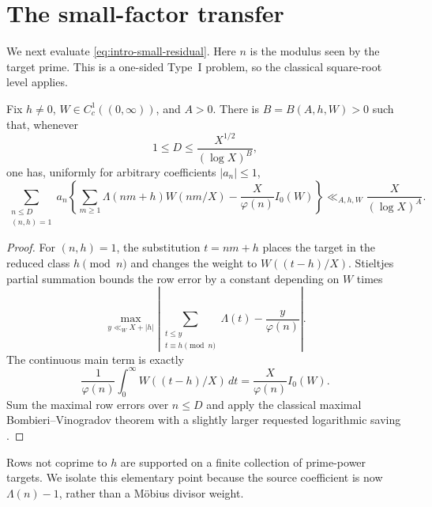 \section{The small-factor transfer}
\label{sec:small-factor-transfer}

We next evaluate \eqref{eq:intro-small-residual}.  Here $n$ is the modulus
seen by the target prime.  This is a one-sided Type~I problem, so the
classical square-root level applies.

\begin{theorem}
\label{thm:fixed-product-Type-I}
Fix $h\ne0$, $W\in C_c^1((0,\infty))$, and $A>0$.  There is
$B=B(A,h,W)>0$ such that, whenever
\begin{equation}\label{eq:fixed-product-BV-range}
 1\leq D\leq\frac{X^{1/2}}{(\log X)^B},
\end{equation}
one has, uniformly for arbitrary coefficients $|a_n|\leq1$,
\begin{equation}\label{eq:fixed-product-Type-I}
 \sum_{\substack{n\leq D\\(n,h)=1}}a_n
 \left\{
   \sum_{m\geq1}\Lambda(nm+h)W(nm/X)
   -\frac{X}{\varphi(n)}I_0(W)
 \right\}
 \ll_{A,h,W}\frac{X}{(\log X)^A}.
\end{equation}
\end{theorem}

\begin{proof}
For $(n,h)=1$, the substitution $t=nm+h$ places the target in the reduced
class $h\pmod n$ and changes the weight to $W((t-h)/X)$.  Stieltjes partial
summation bounds the row error by a constant depending on $W$ times
\[
 \max_{y\ll_W X+|h|}
 \left|
  \sum_{\substack{t\leq y\\t\equiv h\pmod n}}\Lambda(t)
  -\frac{y}{\varphi(n)}
 \right|.
\]
The continuous main term is exactly
\[
 \frac1{\varphi(n)}\int_0^\infty W((t-h)/X)\,dt
 =\frac{X}{\varphi(n)}I_0(W).
\]
Sum the maximal row errors over $n\leq D$ and apply the classical maximal
Bombieri--Vinogradov theorem with a slightly larger requested logarithmic
saving \citep{Bombieri1965,Vinogradov1965,IwaniecKowalski2004}.
\end{proof}

Rows not coprime to $h$ are supported on a finite collection of
prime-power targets.  We isolate this elementary point because the source
coefficient is now $\Lambda(n)-1$, rather than a M\"obius divisor weight.

